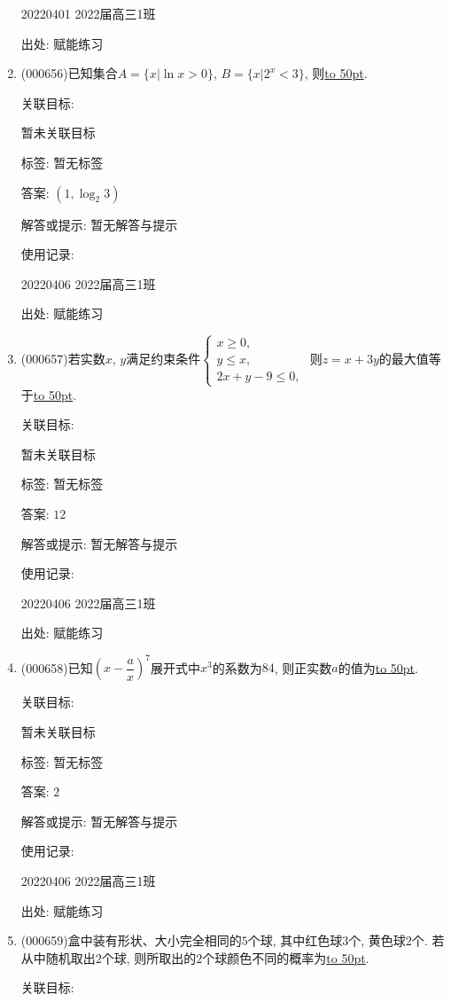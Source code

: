 \documentclass[10pt,a4paper]{article}
\newcommand{\blank}[1]{\underline{\hbox to #1pt{}}}
\begin{document}
\begin{enumerate}[1.]
20220401	2022届高三1班	


出处: 赋能练习
\item { (000656)}已知集合$A=\{x|\ln x>0 \}$, $B=\{x|2^x<3\}$, 则\blank{50}.


关联目标:

暂未关联目标



标签: 暂无标签

答案: $(1,\log_2 3)$

解答或提示: 暂无解答与提示

使用记录:

20220406	2022届高三1班	


出处: 赋能练习
\item { (000657)}若实数$x$, $y$满足约束条件$\begin{cases} x\ge 0, \\  y\le x, \\  2x+y-9 \le 0, \end{cases}$ 则$z=x+3y$的最大值等于\blank{50}.


关联目标:

暂未关联目标



标签: 暂无标签

答案: $12$

解答或提示: 暂无解答与提示

使用记录:

20220406	2022届高三1班	


出处: 赋能练习
\item { (000658)}已知$(x-\dfrac ax)^7$展开式中$x^3$的系数为$84$, 则正实数$a$的值为\blank{50}.


关联目标:

暂未关联目标



标签: 暂无标签

答案: $2$

解答或提示: 暂无解答与提示

使用记录:

20220406	2022届高三1班	


出处: 赋能练习
\item { (000659)}盒中装有形状、大小完全相同的$5$个球, 其中红色球$3$个, 黄色球$2$个. 若从中随机取出$2$个球, 则所取出的$2$个球颜色不同的概率为\blank{50}.


关联目标:


\end{enumerate}
\end{document}
